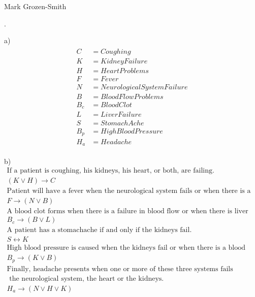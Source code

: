 \documentclass[11pt]{article}
\begin{document}
 \hfill Mark Grozen-Smith

\bigskip

.

	a) 
	\begin{gather}
	\begin{align*}
		C &= Coughing \\
		K &= Kidney Failure  \\
		H &= Heart Problems \\
		F &= Fever \\
		N &= Neurological System Failure \\
		B &= Blood Flow Problems \\
		B_c &= Blood Clot\\
		L &= Liver Failure \\
		S &= Stomach Ache\\
		B_p &= High Blood Pressure \\
		H_a &= Headache 
	\end{align*}
	\end{gather}
\smallskip
	
	b) 
	\begin{gather*}
	\text{If a patient is coughing, his kidneys, his heart, or both, are failing.}\\
	(K\vee H) \rightarrow C\\
	\text{Patient will have a fever when the neurological system fails or when there is a problem of blood flow.}\\ 
	F \rightarrow (N \vee B) \\
	\text{A blood clot forms when there is a failure in blood flow or when there is liver failure.} \\
	B_c \rightarrow (B \vee L)\\
	\text{A patient has a stomachache if and only if the kidneys fail.}\\
	S \leftrightarrow K\\
	\text{High blood pressure is caused when the kidneys fail or when there is a blood flow problem.} \\
	B_p \rightarrow (K \vee B)\\
	\text{Finally, headache presents when one or more of these three systems fails }\\
	\text{ the neurological system, the heart or the kidneys.}\\
	H_a \rightarrow (N \vee H \vee K)
	\end{gather*}

	
\end{document}
